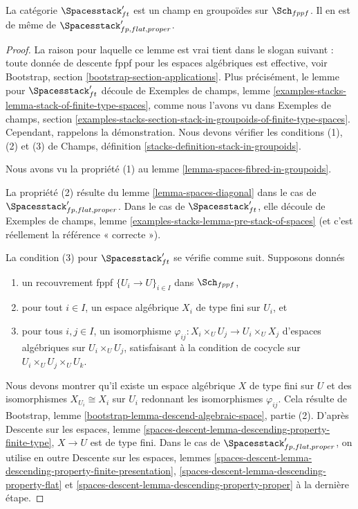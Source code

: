 \begin{lemma}
\label{lemma-spaces-stack}
La catégorie $\Spacesstack'_{ft}$ est un champ en groupoïdes
sur $\Sch_{fppf}$. Il en est de même de
$\Spacesstack'_{fp, flat, proper}$.
\end{lemma}

\begin{proof}
La raison pour laquelle ce lemme est vrai tient dans le slogan suivant : toute
donnée de descente fppf pour les espaces algébriques est effective, voir
Bootstrap, section \ref{bootstrap-section-applications}.
Plus précisément, le lemme pour $\Spacesstack'_{ft}$ découle de
Exemples de champs, lemme
\ref{examples-stacks-lemma-stack-of-finite-type-spaces},
comme nous l'avons vu dans Exemples de champs, section
\ref{examples-stacks-section-stack-in-groupoids-of-finite-type-spaces}.
Cependant, rappelons la démonstration. Nous devons vérifier les conditions
(1), (2) et (3) de Champs, définition
\ref{stacks-definition-stack-in-groupoids}.

\medskip\noindent
Nous avons vu la propriété (1) au lemme
\ref{lemma-spaces-fibred-in-groupoids}.

\medskip\noindent
La propriété (2) résulte du lemme \ref{lemma-spaces-diagonal} dans le cas de
$\Spacesstack'_{fp, flat, proper}$.
Dans le cas de $\Spacesstack'_{ft}$, elle découle de
Exemples de champs, lemme
\ref{examples-stacks-lemma-pre-stack-of-spaces}
(et c'est réellement la référence « correcte »).

\medskip\noindent
La condition (3) pour $\Spacesstack'_{ft}$ se vérifie comme suit. Supposons
donnés
\begin{enumerate}
\item un recouvrement fppf $\{U_i \to U\}_{i \in I}$ dans $\Sch_{fppf}$,
\item pour tout $i \in I$, un espace algébrique $X_i$ de type fini sur
$U_i$, et
\item pour tous $i, j \in I$, un isomorphisme
$\varphi_{ij} : X_i \times_U U_j \to U_i \times_U X_j$ d'espaces algébriques
sur $U_i \times_U U_j$, satisfaisant à la condition de cocycle sur
$U_i \times_U U_j \times_U U_k$.
\end{enumerate}
Nous devons montrer qu'il existe un espace algébrique $X$ de type fini sur $U$
et des isomorphismes $X_{U_i} \cong X_i$ sur $U_i$ redonnant les
isomorphismes $\varphi_{ij}$. Cela résulte de
Bootstrap, lemme \ref{bootstrap-lemma-descend-algebraic-space}, partie (2).
D'après Descente sur les espaces, lemme
\ref{spaces-descent-lemma-descending-property-finite-type},
$X \to U$ est de type fini.
Dans le cas de $\Spacesstack'_{fp, flat, proper}$, on utilise en outre
Descente sur les espaces, lemmes
\ref{spaces-descent-lemma-descending-property-finite-presentation},
\ref{spaces-descent-lemma-descending-property-flat} et
\ref{spaces-descent-lemma-descending-property-proper}
à la dernière étape.
\end{proof}

